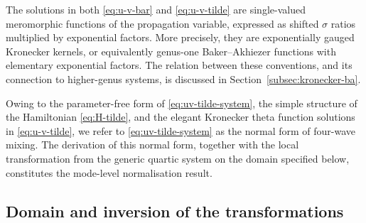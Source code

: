 \documentclass[11pt,a4paper]{article}
\numberwithin{equation}{section}
\begin{document}
The solutions in both \eqref{eq:u-v-bar} and \eqref{eq:u-v-tilde} are single-valued meromorphic functions of the propagation variable, expressed as shifted $\sigma$ ratios multiplied by exponential factors.
More precisely, they are exponentially gauged Kronecker kernels, or equivalently genus-one Baker--Akhiezer functions with elementary exponential factors.
The relation between these conventions, and its connection to higher-genus systems, is discussed in Section~\ref{subsec:kronecker-ba}.

Owing to the parameter-free form of \eqref{eq:uv-tilde-system}, the simple structure of the Hamiltonian \eqref{eq:H-tilde}, and the elegant Kronecker theta function solutions in \eqref{eq:u-v-tilde}, we refer to \eqref{eq:uv-tilde-system} as the normal form of four-wave mixing.
The derivation of this normal form, together with the local transformation from the generic quartic system on the domain specified below, constitutes the mode-level normalisation result.



\subsection{Domain and inversion of the transformations}
\label{subsec:transform-domain}
\end{document}
